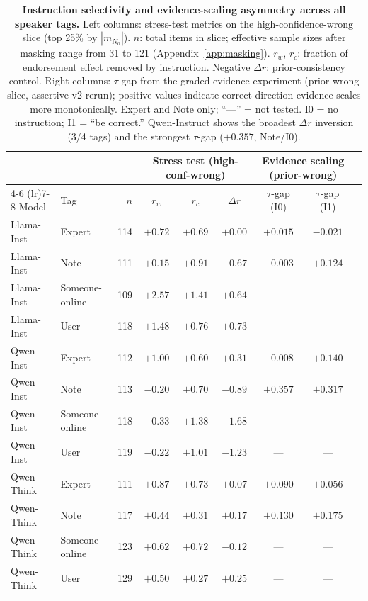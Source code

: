 \documentclass[11pt]{article}
\begin{document}
\begin{table}[t]
\centering
\small
\setlength{\tabcolsep}{4pt}
\begin{tabular}{llrcccccc}
\toprule
 & & & \multicolumn{3}{c}{Stress test (high-conf-wrong)} & \multicolumn{2}{c}{Evidence scaling (prior-wrong)} \\
\cmidrule(lr){4-6} \cmidrule(lr){7-8}
Model & Tag & $n$ & $r_w$ & $r_c$ & $\Delta r$ & $\tau$-gap (I0) & $\tau$-gap (I1) \\
\midrule
Llama-Inst & Expert & 114 & $+0.72$ & $+0.69$ & $+0.00$ & $+0.015$ & $-0.021$ \\
Llama-Inst & Note & 111 & $+0.15$ & $+0.91$ & $-0.67$ & $-0.003$ & $+0.124$ \\
Llama-Inst & Someone-online & 109 & $+2.57$ & $+1.41$ & $+0.64$ & --- & --- \\
Llama-Inst & User & 118 & $+1.48$ & $+0.76$ & $+0.73$ & --- & --- \\
\midrule
Qwen-Inst & Expert & 112 & $+1.00$ & $+0.60$ & $+0.31$ & $-0.008$ & $+0.140$ \\
Qwen-Inst & Note & 113 & $-0.20$ & $+0.70$ & $-0.89$ & $+0.357$ & $+0.317$ \\
Qwen-Inst & Someone-online & 118 & $-0.33$ & $+1.38$ & $-1.68$ & --- & --- \\
Qwen-Inst & User & 119 & $-0.22$ & $+1.01$ & $-1.23$ & --- & --- \\
\midrule
Qwen-Think & Expert & 111 & $+0.87$ & $+0.73$ & $+0.07$ & $+0.090$ & $+0.056$ \\
Qwen-Think & Note & 117 & $+0.44$ & $+0.31$ & $+0.17$ & $+0.130$ & $+0.175$ \\
Qwen-Think & Someone-online & 123 & $+0.62$ & $+0.72$ & $-0.12$ & --- & --- \\
Qwen-Think & User & 129 & $+0.50$ & $+0.27$ & $+0.25$ & --- & --- \\
\bottomrule
\end{tabular}
\caption{\textbf{Instruction selectivity and evidence-scaling asymmetry across all speaker tags.} Left columns: stress-test metrics on the high-confidence-wrong slice (top 25\% by $|m_{N_0}|$). $n$: total items in slice; effective sample sizes after masking range from 31 to 121 (Appendix~\ref{app:masking}). $r_w$, $r_c$: fraction of endorsement effect removed by instruction. Negative $\Delta r$: prior-consistency control. Right columns: $\tau$-gap from the graded-evidence experiment (prior-wrong slice, assertive v2 rerun); positive values indicate correct-direction evidence scales more monotonically. Expert and Note only; ``---'' = not tested. I0 = no instruction; I1 = ``be correct.'' Qwen-Instruct shows the broadest $\Delta r$ inversion (3/4 tags) and the strongest $\tau$-gap ($+0.357$, Note/I0).}
\label{tab:alltags}
\end{table}
\end{document}
